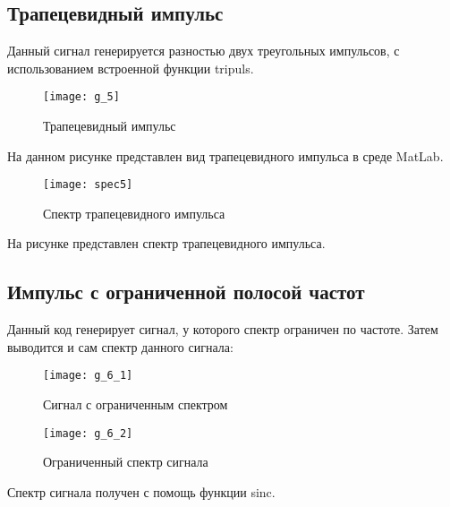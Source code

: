 \subsection{Трапецевидный импульс}


\parindent=1cm
Данный сигнал генерируется разностью двух треугольных импульсов, с использованием встроенной функции tripuls.

\begin{figure}[H]
	\begin{center}
		\texttt{[image: g\_5]}
		\caption{Трапецевидный импульс} 
		\label{pic:g_5} %
	\end{center}
\end{figure}
На данном рисунке представлен вид трапецевидного импульса в среде MatLab.

\begin{figure}[H]
	\begin{center}
		\texttt{[image: spec5]}
		\caption{Спектр трапецевидного импульса} 
		\label{pic:spec5} %
	\end{center}
\end{figure}
На рисунке представлен спектр трапецевидного импульса.

\subsection{Импульс с ограниченной полосой частот}


\parindent=1cm
Данный код генерирует сигнал, у которого спектр ограничен по частоте. Затем выводится и сам спектр данного сигнала:

\begin{figure}[H]
	\begin{center}
		\texttt{[image: g\_6\_1]}
		\caption{Сигнал с ограниченным спектром} 
		\label{pic:g_6_1} %
	\end{center}
\end{figure}
\begin{figure}[H]
	\begin{center}
		\texttt{[image: g\_6\_2]}
		\caption{Ограниченный спектр сигнала} 
		\label{pic:g_6_2} %
	\end{center}
\end{figure}
Спектр сигнала получен с помощь функции sinc.

